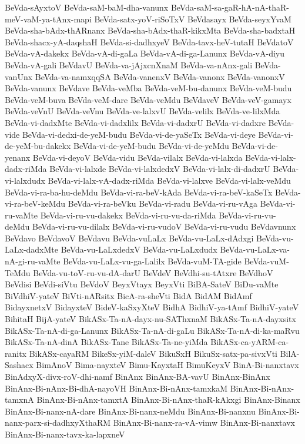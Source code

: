 {BeVda-sAyxtoV
BeVda-saM-baM-dha-vanunx
BeVda-saM-sa-gaR-hA-nA-thaR-meV-vaM-ya-tAnx-mapi
BeVda-satx-yoV-riSoTxV
BeVdasayx
BeVda-seyxYvaM
BeVda-sha-bAdx-thARnanx
BeVda-sha-bAdx-thaR-kikxMta
BeVda-sha-badxtaH
BeVda-shacx-yA-daqshaH
BeVda-si-dadhxyeV
BeVda-tavx-heV-tutaH
BeVdatoV
BeVda-vA-dakekx
BeVda-vA-di-gaLa
BeVda-vA-di-ga-Lanunx
BeVda-vA-diyu
BeVda-vA-gali
BeVdavU
BeVda-va-jAjxcnXnaM
BeVda-va-nAnx-gali
BeVda-vanUnx
BeVda-va-namxqqSA
BeVda-vanenxV
BeVda-vanonx
BeVda-vanonxV
BeVda-vanunx
BeVdave
BeVda-veMba
BeVda-veM-bu-danunx
BeVda-veM-budu
BeVda-veM-buva
BeVda-veM-dare
BeVda-veMdu
BeVdaveV
BeVda-veV-gamayx
BeVda-veVnU
BeVda-veVnu
BeVda-ve-lalxvU
BeVda-velilx
BeVda-ve-lilxMda
BeVda-vi-dadxMte
BeVda-vi-dadxlilx
BeVda-vi-dadxrU
BeVda-vi-dadxre
BeVda-vide
BeVda-vi-dedxi-de-yeM-budu
BeVda-vi-de-yaSeTx
BeVda-vi-deye
BeVda-vi-de-yeM-bu-dakekx
BeVda-vi-de-yeM-budu
BeVda-vi-de-yeMdu
BeVda-vi-de-yenanx
BeVda-vi-deyoV
BeVda-vidu
BeVda-vilalx
BeVda-vi-lalxda
BeVda-vi-lalx-dadx-riMda
BeVda-vi-lalxde
BeVda-vi-lalxdedxV
BeVda-vi-lalx-di-dadxrU
BeVda-vi-lalxdudx
BeVda-vi-lalx-vA-dadx-riMda
BeVda-vi-lalxve
BeVda-vi-lalx-veMdu
BeVda-vi-ra-ba-hu-deMdu
BeVda-vi-ra-beV-kAda
BeVda-vi-ra-beV-kaSeTx
BeVda-vi-ra-beV-keMdu
BeVda-vi-ra-beVku
BeVda-vi-radu
BeVda-vi-ru-vAga
BeVda-vi-ru-vaMte
BeVda-vi-ru-vu-dakekx
BeVda-vi-ru-vu-da-riMda
BeVda-vi-ru-vu-deMdu
BeVda-vi-ru-vu-dilalx
BeVda-vi-ru-vudoV
BeVda-vi-ru-vudu
BeVdavnunx
BeVdavo
BeVdavoV
BeVdavu
BeVda-vuLaLx
BeVda-vu-LaLx-dAdxgi
BeVda-vu-LaLx-dadxMte
BeVda-vu-LaLxdedxV
BeVda-vu-LaLxdudx
BeVda-vu-LaLx-va-nA-gi-ru-vaMte
BeVda-vu-LaLx-vu-ga-Lalilx
BeVda-vuM-TA-gide
BeVda-vuM-TeMdu
BeVda-vu-toV-ru-vu-dA-darU
BeVdeV
BeVdhi-su-tAtxre
BeVdhoV
BeVdisi
BeVdi-siVtu
BeVdoV
BeyxVtayx
BeyxVti
BiBA-SateV
BiDu-vaMte
BiVdhiV-yateV
BiVti-nARsitx
BicA-ra-sheVti
BidA
BidAM
BidAmf
BidayxnetxV
BidayxteV
BideV-kaSxyXteV
BidhA
BidhiV-ya-tAmf
BidhiV-yateV
BihitaH
BijA-yateV
BikASx-Ta-nA-dayx-nu-SAThxnaM
BikASx-Ta-nA-dayxsitx
BikASx-Ta-nA-di-ga-Lanunx
BikASx-Ta-nA-di-gaLu
BikASx-Ta-nA-di-ka-maRvu
BikASx-Ta-nA-dinA
BikASx-Tane
BikASx-Ta-ne-yiMda
BikASx-ca-yARM-ca-ranitx
BikASx-cayaRM
BikeSx-yiM-daleV
BikuSxH
BikuSx-satx-pa-sivxVti
BilA-Sashacx
BimAnoV
Bima-nayxteV
Bimu-KayxtaH
BimuKeyxV
BinA-Bi-nanxtavx
BinAdxyX-divx-roV-dhi-namf
BinAnx
BinAnx-BA-vavU
BinAnx-BinAnx
BinAnx-Bi-nAnx-Bi-dhA-nayoVH
BinAnx-Bi-nAnx-tamxkaM
BinAnx-Bi-nAnx-tamxnA
BinAnx-Bi-nAnx-tamxtA
BinAnx-Bi-nAnx-thaR-kAkxgi
BinAnx-Binanx
BinAnx-Bi-nanx-nA-dare
BinAnx-Bi-nanx-neMdu
BinAnx-Bi-nanxnu
BinAnx-Bi-nanx-parx-si-dadhxyXthaRM
BinAnx-Bi-nanx-ra-vA-vimw
BinAnx-Bi-nanxtavx
BinAnx-Bi-nanx-tavx-ka-lapxneV
}
